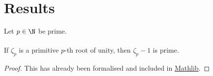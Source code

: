 \begin{definition}[Field]
    \label{def:field}
\end{definition}
\begin{definition}
    \label{def:number_field}
\end{definition}

\begin{definition}
    \label{def:fundamental_system}
\end{definition}

\begin{definition}[Unit]
    \label{def:primitive_element}
\end{definition}
\begin{definition}
    \label{def:primitive_root_of_unity}
\end{definition}

\begin{definition}
    \label{def:cyclotomic_polynomial}
\end{definition}
\begin{definition}
    \label{def:cyclotomic_extension_field}
\end{definition}
\begin{definition}
    \label{def:cyclotomic_extension_field}
\end{definition}



\section{Results}

\begin{theorem}
    \label{thm:zeta_sub_one_prime1}
    \leanok
    Let $p \in \N$ be prime. \\\\
    If $\zeta_p$ is a primitive $p$-th root of unity, then $\zeta_p - 1$ is prime.
\end{theorem}
\begin{proof}
    \leanok
    This has already been formalised and included in \href{https://pitmonticone.github.io/FLT3/docs/FLT3/Mathlib/NumberTheory/Cyclotomic/Rat.html#IsPrimitiveRoot.zeta_sub_one_prime'}{Mathlib}.
\end{proof}

